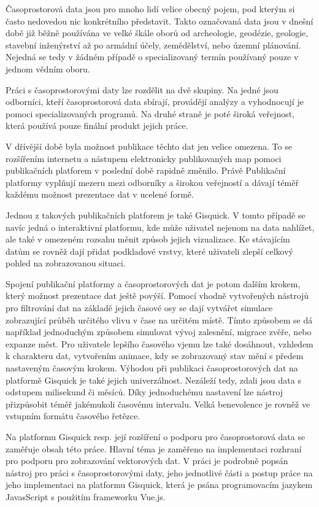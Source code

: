  Časoprostorová data jsou pro mnoho lidí velice obecný pojem, pod kterým si často nedovedou nic konkrétního představit. Takto označovaná data jsou v dnešní době již běžně používána ve velké škále oborů od archeologie, geodézie, geologie, stavební inženýrství až po armádní účely, zemědělství, nebo územní plánování. Nejedná se tedy v žádném případě o specializovaný termín používaný pouze v jednom vědním oboru. 

Práci s časoprostorovými daty lze rozdělit na dvě skupiny. Na jedné jsou odborníci, kteří časoprostorová data sbírají, provádějí analýzy a vyhodnocují je pomoci specializovaných programů. Na druhé straně je poté široká veřejnost, která používá pouze finální produkt jejich práce. 

V dřívější době byla možnost publikace těchto dat jen velice omezena. To se rozšířením internetu a nástupem elektronicky publikovaných map pomoci publikačních platforem v poslední době rapidně změnilo. Právě Publikační platformy vyplňují mezeru mezi odborníky a širokou veřejností a dávají téměř každému možnost prezentace dat v ucelené formě. 

Jednou z takových publikačních platforem je také Gisquick. V tomto případě se navíc jedná o interaktivní platformu, kde může uživatel nejenom na data nahlížet, ale také v omezeném rozsahu měnit způsob jejich vizualizace. Ke stávajícím datům se rovněž dají přidat podkladové vrstvy, které uživateli zlepší celkový pohled na zobrazovanou situaci.

Spojení publikační platformy a časoprostorových dat je potom dalším krokem, který možnost prezentace dat ještě povýší. Pomocí vhodně vytvořených nástrojů pro filtrování dat na základě jejich časové osy se dají vytvářet simulace zobrazující průběh určitého vlivu v čase na určitém místě. Tímto způsobem se dá například jednoduchým způsobem simulovat vývoj zalesnění, migrace zvěře, nebo expanze měst. Pro uživatele lepšího časového vjemu lze také dosáhnout, vzhledem k charakteru dat, vytvořením animace, kdy se zobrazovaný stav mění s předem nastaveným časovým krokem. 
Výhodou při publikaci časoprostorových dat na platformě Gisquick je také jejich univerzálnost. Nezáleží tedy, zdali jsou data s odstupem milisekund či měsíců. Díky jednoduchému nastavení lze nástroj přizpůsobit téměř jakémukoli časovému intervalu. Velká benevolence je rovněž ve vstupním formátu časového řetězce.  


\bigskip
Na platformu Gisquick resp. její rozšíření o podporu pro časoprostorová data se zaměřuje obsah této práce. Hlavní téma je zaměřeno na implementaci rozhraní pro podporu pro zobrazování vektorových dat. V práci je podrobně popsán nástroj pro práci s časoprostorovými daty, jeho jednotlivé části a postup práce na jeho implementaci na platformu Gisquick, která je psána programovacím jazykem JavasScript s použitím frameworku Vue.js. 


